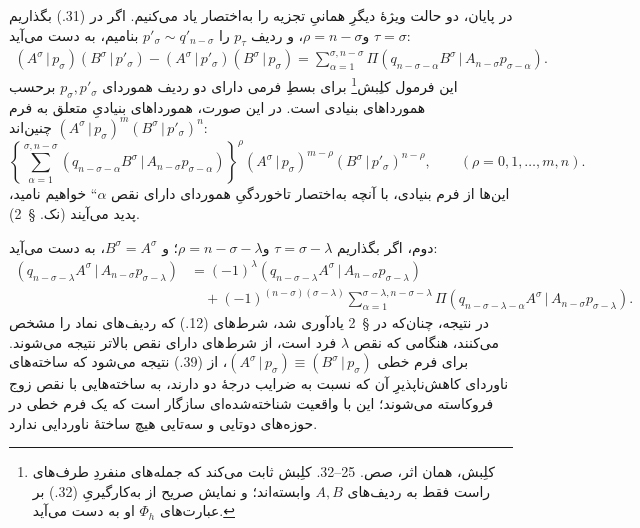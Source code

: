 \documentclass[11pt]{article}
\providecommand{\glqq}{\textquotedblbase}
\providecommand{\grqq}{\textquotedblleft}
\providecommand{\pair}[2]{(#1\,|\,#2)}
\begin{document}
در پایان، دو حالت ویژهٔ دیگرِ همانیِ تجزیه را به‌اختصار یاد می‌کنیم. اگر در (31.) بگذاریم $\tau=\sigma$ و$\rho=n-\sigma$، و ردیف $p_\tau$ را $p'_\sigma\sim q'_{n-\sigma}$ بنامیم، به دست می‌آید:
\begin{equation}
\begin{aligned}
\pair{A^\sigma}{p_\sigma}\pair{B^\sigma}{p'_\sigma}
-\pair{A^\sigma}{p'_\sigma}\pair{B^\sigma}{p_\sigma}
=\sum_{\alpha=1}^{\sigma,n-\sigma}
\Pi\pair{q_{n-\sigma-\alpha}B^\sigma}{A_{n-\sigma}p_{\sigma-\alpha}}.
\end{aligned}
\tag{37}
\end{equation}
این فرمول کلِبش\footnote{کلِبش، همان اثر، صص. 25--32. کلِبش ثابت می‌کند که جمله‌های منفردِ طرف‌های راست فقط به ردیف‌های $A,B$ وابسته‌اند؛ و نمایش صریح از به‌کارگیریِ (32.) بر عبارت‌های $\Phi_h$ او به دست می‌آید.} برای بسطِ فرمی دارای دو ردیف هموردای $p_\sigma,p'_\sigma$ برحسب همورداهای بنیادی است. در این صورت، همورداهای بنیادیِ متعلق به فرم $\pair{A^\sigma}{p_\sigma}^m\pair{B^\sigma}{p'_\sigma}^n$ چنین‌اند:
\begin{equation}
 \left\{\sum_{\alpha=1}^{\sigma,n-\sigma}
 \pair{q_{n-\sigma-\alpha}B^\sigma}{A_{n-\sigma}p_{\sigma-\alpha}}
 \right\}^{\rho}
 \pair{A^\sigma}{p_\sigma}^{m-\rho}\pair{B^\sigma}{p'_\sigma}^{n-\rho},
 \qquad (\rho=0,1,\ldots,m,n).
\tag{38}
\end{equation}
این‌ها از فرم بنیادی، با آنچه به‌اختصار \glqq{}تاخوردگیِ هموردای دارای نقص $\alpha$\grqq{} خواهیم نامید، پدید می‌آیند (نک. \S\ 2).

دوم، اگر بگذاریم $\tau=\sigma-\lambda$ و$\rho=n-\sigma-\lambda$؛ و $B^\sigma=A^\sigma$، به دست می‌آید:
\begin{equation}
\begin{aligned}
\pair{q_{n-\sigma-\lambda}A^\sigma}{A_{n-\sigma}p_{\sigma-\lambda}}
&=(-1)^\lambda\pair{q_{n-\sigma-\lambda}A^\sigma}{A_{n-\sigma}p_{\sigma-\lambda}}\\
&\quad+(-1)^{(n-\sigma)(\sigma-\lambda)}
 \sum_{\alpha=1}^{\sigma-\lambda,n-\sigma-\lambda}
 \Pi\pair{q_{n-\sigma-\lambda-\alpha}A^\sigma}{A_{n-\sigma}p_{\sigma-\lambda}}.
\end{aligned}
\tag{39}
\end{equation}
در نتیجه، چنان‌که در \S\ 2 یادآوری شد، شرط‌های (12.) که ردیف‌های نماد را مشخص می‌کنند، هنگامی که نقص $\lambda$ فرد است، از شرط‌های دارای نقص بالاتر نتیجه می‌شوند. برای فرم خطی $\pair{A^\sigma}{p_\sigma}\equiv\pair{B^\sigma}{p_\sigma}$، از (39.) نتیجه می‌شود که ساخته‌های ناوردای کاهش‌ناپذیرِ آن که نسبت به ضرایب درجهٔ دو دارند، به ساخته‌هایی با نقص زوج فروکاسته می‌شوند؛ این با واقعیت شناخته‌شده‌ای سازگار است که یک فرم خطی در حوزه‌های دوتایی و سه‌تایی هیچ ساختهٔ ناوردایی ندارد.
\end{document}
